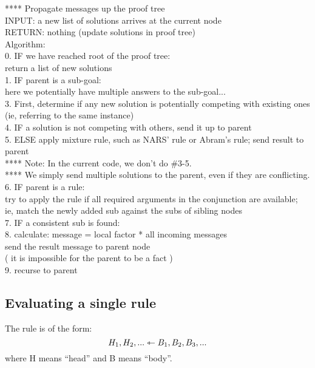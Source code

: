 **** Propagate messages up the proof tree\\
INPUT:   a new list of solutions arrives at the current node\\
RETURN:  nothing (update solutions in proof tree)\\
Algorithm:\\
0.  IF  we have reached root of the proof tree:\\
\tab    return a list of new solutions\\
1.  IF  parent is a sub-goal:\\
\tab    here we potentially have multiple answers to the sub-goal...\\
3.  First, determine if any new solution is potentially competing with existing ones\\
\tab   (ie, referring to the same instance)\\
4. IF       a solution is not competing with others, send it up to parent\\
5. ELSE apply mixture rule, such as NARS' rule or Abram's rule;  send result to parent\\
**** Note:  In the current code, we don't do \#3-5.\\
****        We simply send multiple solutions to the parent, even if they are conflicting.\\
6. IF  parent is a rule:\\
%
%
\tab try to apply the rule if all required arguments in the conjunction are available;\\
\tab ie, match the newly added sub against the subs of sibling nodes\\
7. IF  a consistent sub is found:\\
8. calculate:  message = local factor * all incoming messages\\
\tab send the result message to parent node\\
\tab ( it is impossible for the parent to be a fact ) \\
9. recurse to parent

\subsection{Evaluating a single rule}

The rule is of the form:
$$ H_1, H_2, ... \leftarrowtriangle B_1, B_2, B_3, ... \nonumber $$
where H means ``head'' and B means ``body''.

